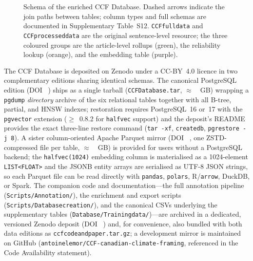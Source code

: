 \documentclass[12pt]{article}
\renewcommand\_{\texttt{\detokenize{_}\allowbreak}}
\begin{document}
\begin{figure}[H]
{
}%
\caption{Schema of the enriched CCF Database. Dashed arrows indicate the join paths between tables; column types and full schemas are documented in Supplementary Table~S12. \texttt{CCF\_full\_data} and \texttt{CCF\_processed\_data} are the original sentence-level resource; the three coloured groups are the article-level rollups (green), the reliability lookup (orange), and the embedding table (purple).}
\label{fig:database_structure}
\end{figure}

The CCF Database is deposited on Zenodo under a CC-BY~4.0 licence in two complementary editions sharing identical schemas. The canonical PostgreSQL edition (DOI \CCFsqldoi{}~\autocite{lemor_ccf_database_2026}) ships as a single tarball (\texttt{CCF\_Database.tar}, $\approx$~\CCFsqlsize{}~GB) wrapping a \texttt{pg\_dump} \emph{directory} archive of the six relational tables together with all B-tree, partial, and HNSW indexes; restoration requires PostgreSQL~16 or~17 with the \texttt{pgvector} extension ($\geq$~0.8.2 for \texttt{halfvec} support) and the deposit's README provides the exact three-line restore command (\texttt{tar -xf}, \texttt{createdb}, \texttt{pg\_restore -j 8}). A sister column-oriented Apache Parquet mirror (DOI \CCFparquetdoi{}~\autocite{lemor_ccf_database_parquet_2026}, one ZSTD-compressed file per table, $\approx$~\CCFparquetsize{}~GB) is provided for users without a PostgreSQL backend; the \texttt{halfvec(1024)} embedding column is materialised as a 1024-element \texttt{LIST<FLOAT>} and the JSONB entity arrays are serialised as UTF-8 JSON strings, so each Parquet file can be read directly with \texttt{pandas}, \texttt{polars}, R/\texttt{arrow}, DuckDB, or Spark. The companion code and documentation---the full annotation pipeline (\texttt{Scripts/Annotation/}), the enrichment and export scripts (\texttt{Scripts/Database\_creation/}), and the canonical CSVs underlying the supplementary tables (\texttt{Database/Training\_data/})---are archived in a dedicated, versioned Zenodo deposit (DOI \CCFcodedoi{}~\autocite{lemor_ccf_code_2026}) and, for convenience, also bundled with both data editions as \texttt{ccf\_code\_and\_paper.tar.gz}; a development mirror is maintained on GitHub (\texttt{antoinelemor/CCF-canadian-climate-framing}, referenced in the Code Availability statement).
\end{document}
